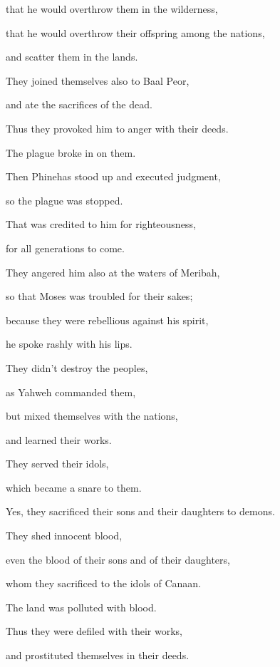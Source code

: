 {\par }{\QB that he would overthrow them in the wilderness,
\par }{\QB {}that he would overthrow their offspring among the nations,
\par }{\QB and scatter them in the lands.
\par }{\Q {}They joined themselves also to Baal Peor,
\par }{\QB and ate the sacrifices of the dead.
\par }{\Q {}Thus they provoked him to anger with their deeds.
\par }{\QB The plague broke in on them.
\par }{\Q {}Then Phinehas stood up and executed judgment,
\par }{\QB so the plague was stopped.
\par }{\Q {}That was credited to him for righteousness,
\par }{\QB for all generations to come.
\par }{\Q {}They angered him also at the waters of Meribah,
\par }{\QB so that Moses was troubled for their sakes;
\par }{\Q {}because they were rebellious against his spirit,
\par }{\QB he spoke rashly with his lips.
\par }{\Q {}They didn’t destroy the peoples,
\par }{\QB as Yahweh commanded them,
\par }{\QB {}but mixed themselves with the nations,
\par }{\QB and learned their works.
\par }{\Q {}They served their idols,
\par }{\QB which became a snare to them.
\par }{\Q {}Yes, they sacrificed their sons and their daughters to demons.
\par }{\QB {}They shed innocent blood,
\par }{\QB even the blood of their sons and of their daughters,
\par }{\QB whom they sacrificed to the idols of Canaan.
\par }{\QB The land was polluted with blood.
\par }{\Q {}Thus they were defiled with their works,
\par }{\QB and prostituted themselves in their deeds.
}
